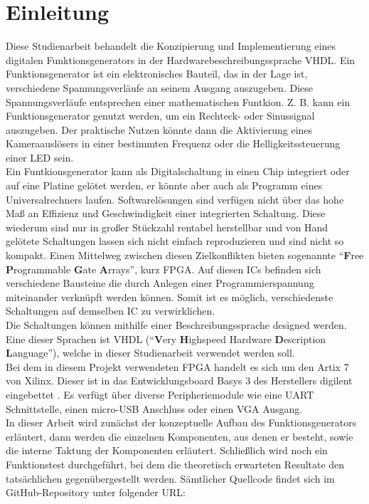 \chapter[Einleitung]{Einleitung}

Diese Studienarbeit behandelt die Konzipierung und Implementierung eines
digitalen Funktionsgenerators in der Hardwarebeschreibungssprache VHDL.
Ein Funktionsgenerator ist ein elektronisches Bauteil, das in der Lage ist,
verschiedene Spannungsverläufe an seinem Ausgang auszugeben. Diese
Spannungsverläufe entsprechen einer mathematischen Funtkion. Z. B. kann ein
Funktionsgenerator genutzt werden, um ein Rechteck- oder Sinussignal auszugeben.
Der praktische Nutzen könnte dann die Aktivierung eines Kameraauslösers in einer bestimmten Frequenz oder die Helligkeitssteuerung einer LED sein. \\
Ein Funtkionsgenerator kann als Digitalschaltung in einen Chip integriert oder auf eine Platine gelötet werden, er könnte aber auch als Programm eines Universalrechners laufen.
Softwarelösungen sind verfügen nicht über das hohe Maß an Effizienz und Geschwindigkeit einer integrierten Schaltung.
Diese wiederum sind nur in großer Stückzahl rentabel herstellbar und von Hand gelötete Schaltungen lassen sich nicht einfach reproduzieren und sind nicht so kompakt.
Einen Mittelweg zwischen diesen Zielkonflikten bieten sogenannte ``\textbf{F}ree \textbf{P}rogrammable \textbf{G}ate \textbf{A}rrays'', kurz FPGA.
Auf diesen ICs befinden sich verschiedene Bausteine die durch Anlegen einer
Programmierspannung miteinander verknüpft werden können. Somit ist es möglich,
verschiedenste Schaltungen auf demselben IC zu verwirklichen.\\
Die Schaltungen können mithilfe einer Beschreibungssprache designed werden.
Eine dieser Sprachen ist VHDL (``\textbf{V}ery \textbf{H}ighspeed Hardware \textbf{D}escription \textbf{L}anguage''), welche in dieser Studienarbeit verwendet werden soll. \\
Bei dem in diesem Projekt verwendeten FPGA handelt es sich um den Artix 7 von Xilinx.
Dieser ist in das Entwicklungsboard Basys 3 des Herstellers digilent eingebettet \cite{digilent2016}.
Es verfügt über diverse Peripheriemodule wie eine UART Schnittstelle, einen micro-USB Anschluss oder einen VGA Ausgang. \\
In dieser Arbeit wird zunächst der konzeptuelle Aufbau des Funktionsgenerators erläutert, dann werden die einzelnen Komponenten, aus denen er besteht, sowie die interne Taktung der Komponenten erläutert.
Schließlich wird noch ein Funktionstest durchgeführt, bei dem die theoretisch erwarteten Resultate den tatsächlichen gegenübergestellt werden.
Sämtlicher Quellcode findet sich im GitHub-Repository unter folgender URL: \\
\href{https://github.com/markushart/studienarbeit_function_generator.git}{}